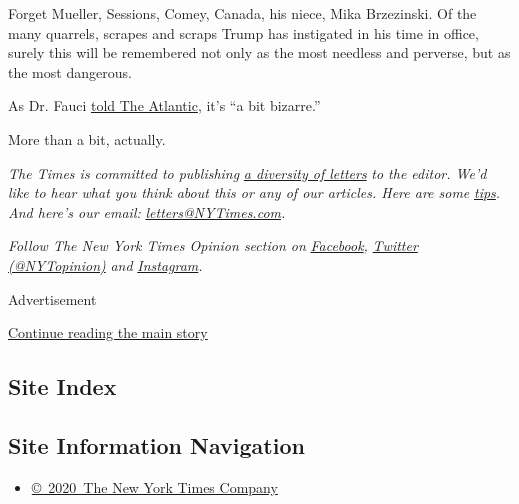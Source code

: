 Forget Mueller, Sessions, Comey, Canada, his niece, Mika Brzezinski. Of
the many quarrels, scrapes and scraps Trump has instigated in his time
in office, surely this will be remembered not only as the most needless
and perverse, but as the most dangerous.

As Dr. Fauci
\href{https://www.theatlantic.com/politics/archive/2020/07/trump-fauci-coronavirus-pandemic-oppo/614224/}{told
The Atlantic}, it's ``a bit bizarre.''

More than a bit, actually.

\emph{The Times is committed to publishing}
\href{https://www.nytimes3xbfgragh.onion/2019/01/31/opinion/letters/letters-to-editor-new-york-times-women.html}{\emph{a
diversity of letters}} \emph{to the editor. We'd like to hear what you
think about this or any of our articles. Here are some}
\href{https://help.nytimes3xbfgragh.onion/hc/en-us/articles/115014925288-How-to-submit-a-letter-to-the-editor}{\emph{tips}}\emph{.
And here's our email:}
\href{mailto:letters@NYTimes.com}{\emph{letters@NYTimes.com}}\emph{.}

\emph{Follow The New York Times Opinion section on}
\href{https://www.facebookcorewwwi.onion/nytopinion}{\emph{Facebook}}\emph{,}
\href{http://twitter.com/NYTOpinion}{\emph{Twitter (@NYTopinion)}}
\emph{and}
\href{https://www.instagram.com/nytopinion/}{\emph{Instagram}}\emph{.}

Advertisement

\protect\hyperlink{after-bottom}{Continue reading the main story}

\hypertarget{site-index}{%
\subsection{Site Index}\label{site-index}}

\hypertarget{site-information-navigation}{%
\subsection{Site Information
Navigation}\label{site-information-navigation}}

\begin{itemize}
\tightlist
\item
  \href{https://help.nytimes3xbfgragh.onion/hc/en-us/articles/115014792127-Copyright-notice}{©~2020~The
  New York Times Company}
\end{itemize}

